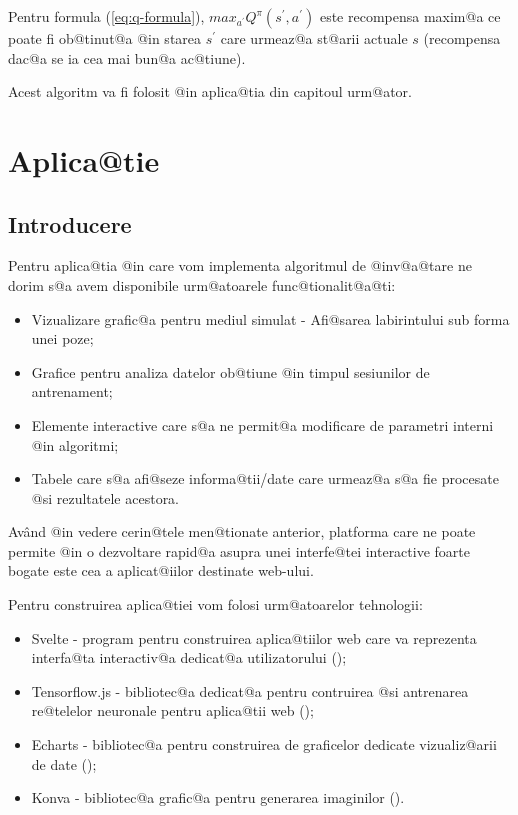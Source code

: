 Pentru formula (\ref{eq:q-formula}), $max_{a^{\prime}} Q^{\pi}(s^{\prime}, a^{\prime})$ este recompensa maxim@a ce poate fi ob@tinut@a @in starea $s^{\prime}$ care urmeaz@a st@arii actuale $s$ (recompensa dac@a se ia cea mai bun@a ac@tiune). 

Acest algoritm va fi folosit @in aplica@tia din capitoul urm@ator.

\chapter{Aplica@tie}

\section{Introducere}
Pentru aplica@tia @in care vom implementa algoritmul de @inv@a@tare ne dorim s@a avem disponibile urm@atoarele func@tionalit@a@ti:

\begin{itemize}
	\item Vizualizare grafic@a pentru mediul simulat - Afi@sarea labirintului sub forma unei poze;
	\item Grafice pentru analiza datelor ob@tiune @in timpul sesiunilor de antrenament;
	\item Elemente interactive care s@a ne permit@a modificare de parametri interni @in algoritmi;
	\item Tabele care s@a afi@seze informa@tii/date care urmeaz@a s@a fie procesate @si rezultatele acestora.
\end{itemize}

Av\^ and @in vedere cerin@tele men@tionate anterior, platforma care ne poate permite @in o dezvoltare rapid@a asupra unei interfe@tei interactive foarte bogate este cea a aplicat@iilor destinate web-ului.

Pentru construirea aplica@tiei vom folosi urm@atoarelor tehnologii:

\begin{itemize}
	\item Svelte - program pentru construirea aplica@tiilor web care va reprezenta interfa@ta interactiv@a dedicat@a utilizatorului (\cite{Svelte});
	\item Tensorflow.js - bibliotec@a dedicat@a pentru contruirea @si antrenarea re@telelor neuronale pentru aplica@tii web (\cite{TensorflowJs});
	\item Echarts - bibliotec@a pentru construirea de graficelor dedicate vizualiz@arii de date (\cite{Echarts});
	\item Konva - bibliotec@a grafic@a pentru generarea imaginilor (\cite{Konva}).
\end{itemize} 

